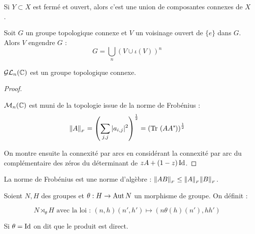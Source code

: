 \begin{lemm}
 
Si $Y\subset X$ est fermé et ouvert, alors c'est une union de composantes
connexes de $X$.
\end{lemm}

\begin{prop}
 
Soit $G$ un groupe topologique connexe et $V$ un voisinage ouvert de $\{e\}$
dans $G$. Alors $V$ engendre $G$ :
\begin{displaymath}
 G = \bigcup_n \left(V\cup \iota(V)\right)^n
\end{displaymath}
\end{prop}

\begin{theo}[Connexité de $\GL_n$]
 
$\mathcal{GL}_n(\mathbb{C})$ est un groupe topologique connexe.
\end{theo}

\begin{proof}\
 
$\mathcal{M}_n(\mathbb{C})$ est muni de la topologie issue de la norme de Frobénius :
\begin{displaymath}
 |\negthinspace\hspace{0.07em}|A|\negthinspace\hspace{0.07em}|_{{}_F} = \left(\sum_{j,j} |a_{i,j}|^2 \right)^{\frac{1}{2}} =
\left(\operatorname{Tr\,}\left(AA^{*}\hspace{-0.1em}\right)\right)^{\frac{1}{2}}
\end{displaymath}

On montre ensuite la connexité par arcs en considérant la connexité par arc du
complémentaire des zéros du déterminant de $zA + (1-z)\operatorname{Id}$.
\end{proof}

\begin{prop}

La norme de Frobénius est une norme d'algèbre : $|\negthinspace\hspace{0.07em}|AB|\negthinspace\hspace{0.07em}|_{{}_F} \leq |\negthinspace\hspace{0.07em}|A|\negthinspace\hspace{0.07em}|_{{}_F} |\negthinspace\hspace{0.07em}|B|\negthinspace\hspace{0.07em}|_{{}_F}$.
\end{prop}

\begin{defi}
 
Soient $N,H$ des groupes et $\theta : H \rightarrow \operatorname{Aut} N$ un morphisme de
groupe. On définit :

\begin{displaymath}
 N\rtimes_\theta H \text{ avec la loi : }
(n,h)(n',h') \mapsto (n\theta(h)(n'), hh')
\end{displaymath}

Si $\theta = \operatorname{Id}$ on dit que le produit est direct.
\end{defi}

